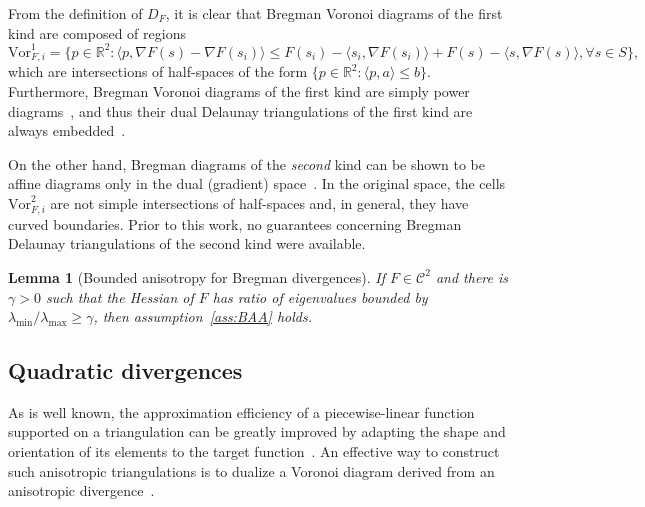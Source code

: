 \documentclass[11pt]{article}
\newtheorem{lemma}{Lemma}
\newcommand{\Sites}{S}
\newcommand{\Vor}{\text{Vor}}
\begin{document}
From the definition of $D_F$, it is clear that Bregman Voronoi diagrams of the first kind are composed of regions 
	\[ \Vor^1_{F,i} = \{ p\in\mathbb{R}^2 : \langle p, \nabla F(s) - \nabla F(s_i)\rangle \le 
			    						F(s_i)-\langle s_i, \nabla F(s_i)\rangle + 
									F(s) - \langle s, \nabla F(s)\rangle , \forall s\in \Sites \}, \]
which are intersections of half-spaces of the form $\{p\in\mathbb{R}^2 : \langle p, a\rangle \le b\}$.
Furthermore, 
	Bregman Voronoi diagrams of the first kind are simply power diagrams~\cite{Bregman}, 
	and thus their dual Delaunay triangulations of the first kind are always embedded~\cite{powerdiag,DMG}. 


On the other hand, Bregman diagrams of the \emph{second} kind can be shown to be affine diagrams 
	only in the dual (gradient) space~\cite{Bregman}. 
In the original space, the cells $\Vor^2_{F,i}$ are not simple intersections of half-spaces and, in general, they have curved boundaries. 
Prior to this work, no guarantees concerning Bregman Delaunay triangulations of the second kind were available. 


\begin{lemma}[Bounded anisotropy for Bregman divergences]\label{lem:DFgamma}
If $F\in\mathcal{C}^2$ and there is $\gamma > 0$ such that the Hessian of $F$ has ratio of eigenvalues bounded by $\lambda_{\text{min}}/\lambda_{\text{max}}\ge \gamma$,
	then assumption~\ref{ass:BAA} holds. 
\end{lemma}



\subsection{Quadratic divergences}\label{sec:DQ}

As is well known, the approximation efficiency of a 
	piecewise-linear function supported on a triangulation can be greatly improved by 
	adapting the shape and orientation of its elements to the target function~\cite{triangle,DAzevedo,DBLP:conf/imr/CanasG06}. 
An effective way to construct such anisotropic triangulations is to dualize a Voronoi diagram 
	derived from an anisotropic divergence~\cite{LS,DW}. 
\end{document}
